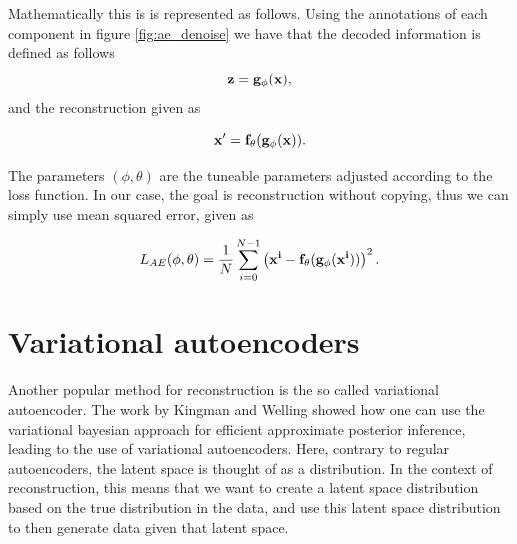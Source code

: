 Mathematically this is is represented as follows\cite{weng2018VAE}. Using the annotations of each component in figure \ref{fig:ae_denoise}
we have that the decoded information is defined as follows 
\begin{equation*}
    \bf{z} = g_{\phi}(\bf{x}),
\end{equation*}    
and the reconstruction given as 

\begin{equation*}
    \bf{x'} = f_{\theta}(g_{\phi}(\bf{x})).
\end{equation*}  

The parameters $(\phi,\theta)$ are the tuneable parameters adjusted according to the loss function. In our case, the goal is
reconstruction without copying, thus we can simply use mean squared error, given as 

\begin{equation}\label{eq:loss_ae}
    L_{AE} (\phi,\theta) = \frac{1}{N}\sum_{i=0}^{N-1} \left(\bf{x}^{i} - f_{\theta}(g_{\phi}(\bf{x}^{i}))\right)^{2}.
\end{equation}

\section{Variational autoencoders}
Another popular method for reconstruction is the so called variational autoencoder. The work by Kingman and Welling \cite{VAE} showed how
one can use the variational bayesian approach for efficient approximate posterior inference, leading to the use of variational autoencoders.
Here, contrary to regular autoencoders, the latent space is thought of as a distribution. In the context of reconstruction, this means that
we want to create a latent space distribution based on the true distribution in the data, and use this latent space distribution to then generate
data given that latent space. 
